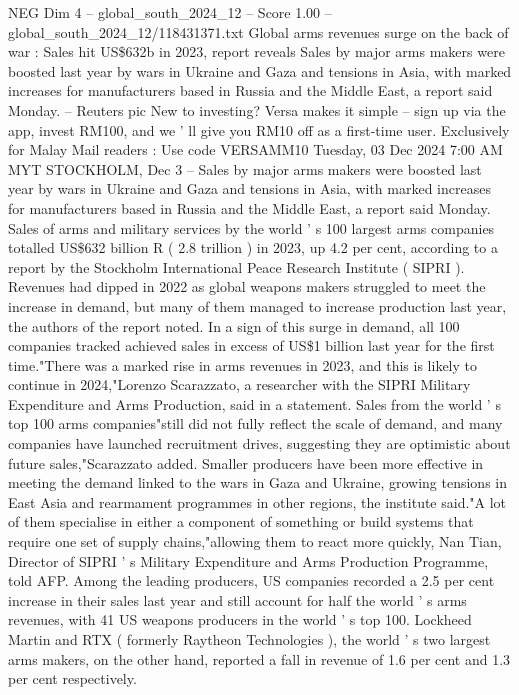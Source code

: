 \begin{textsample}{NEG Dim 4 – global\_south\_2024\_12 – Score 1.00 – global\_south\_2024\_12/118431371.txt}  \label{ex:f4_neg_225}
Global arms revenues surge on the back of war : Sales hit US\$632b in 2023, report reveals Sales by major arms makers were boosted last year by wars in Ukraine and Gaza and tensions in Asia, with marked increases for manufacturers based in Russia and the Middle East, a report said Monday. -- Reuters pic New to investing?
Versa makes it simple -- sign up via the app, invest RM100, and we ' ll give you RM10 off as a first-time user.
Exclusively for Malay Mail readers : Use code VERSAMM10 Tuesday, 03 Dec 2024 7:00 AM MYT STOCKHOLM, Dec 3 -- Sales by major arms makers were boosted last year by wars in Ukraine and Gaza and tensions in Asia, with marked increases for manufacturers based in Russia and the Middle East, a report said Monday.
Sales of arms and military services by the world ' s 100 largest arms companies totalled US\$632 billion R ( 2.8 trillion ) in 2023, up 4.2 per cent, according to a report by the Stockholm International Peace Research Institute ( SIPRI ).
Revenues had dipped in 2022 as global weapons makers struggled to meet the increase in demand, but many of them managed to increase production last year, the authors of the report noted.
In a sign of this surge in demand, all 100 companies tracked achieved sales in excess of US\$1 billion last year for the first time."There was a marked rise in arms revenues in 2023, and this is likely to continue in 2024,"Lorenzo Scarazzato, a researcher with the SIPRI Military Expenditure and Arms Production, said in a statement.
Sales from the world ' s top 100 arms companies"still did not fully reflect the scale of demand, and many companies have launched recruitment drives, suggesting they are optimistic about future sales,"Scarazzato added.
Smaller producers have been more effective in meeting the demand linked to the wars in Gaza and Ukraine, growing tensions in East Asia and rearmament programmes in other regions, the institute said."A lot of them specialise in either a component of something or build systems that require one set of supply chains,"allowing them to react more quickly, Nan Tian, Director of SIPRI ' s Military Expenditure and Arms Production Programme, told AFP.
Among the leading producers, US companies recorded a 2.5 per cent increase in their sales last year and still account for half the world ' s arms revenues, with 41 US weapons producers in the world ' s top 100.
Lockheed Martin and RTX ( formerly Raytheon Technologies ), the world ' s two largest arms makers, on the other hand, reported a fall in revenue of 1.6 per cent and 1.3 per cent respectively.

\end{textsample}
